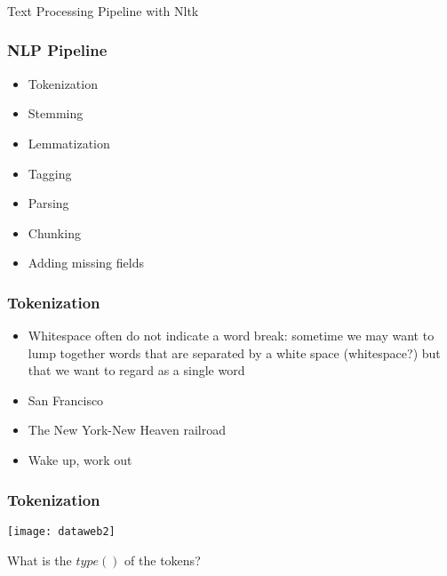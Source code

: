 
\begin{frame}[fragile]\frametitle{}

\begin{center}
{\Large Text Processing Pipeline with Nltk}
\end{center}
\end{frame}

\begin{frame}[fragile]\frametitle{NLP Pipeline}

\begin{itemize}
\item Tokenization
\item Stemming
\item Lemmatization
\item Tagging
\item Parsing 
\item Chunking 
\item Adding missing fields 
\end{itemize}
\end{frame}

\begin{frame}[fragile]
\frametitle{Tokenization}
\begin{itemize}
\item Whitespace often do not indicate a word break: sometime we may want to lump together words that are separated by a white space  (whitespace?) but that we want to regard as a single word
\item San Francisco
\item The New York-New Heaven railroad
\item Wake up, work out
\end{itemize}
\end{frame}

\begin{frame}[fragile]
\frametitle{Tokenization}
\begin{center}
\texttt{[image: dataweb2]}
\end{center}
What is the $type()$ of the tokens?
\end{frame}

